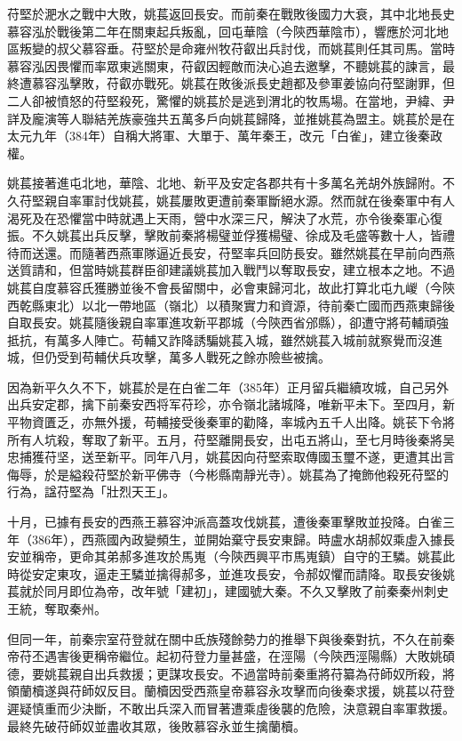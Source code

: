 苻堅於淝水之戰中大敗，姚萇返回長安。而前秦在戰敗後國力大衰，其中北地長史慕容泓於戰後第二年在關東起兵叛亂，回屯華陰（今陝西華陰市），響應於河北地區叛變的叔父慕容垂。苻堅於是命雍州牧苻叡出兵討伐，而姚萇則任其司馬。當時慕容泓因畏懼而率眾東逃關東，苻叡因輕敵而決心追去邀擊，不聽姚萇的諫言，最終遭慕容泓擊敗，苻叡亦戰死。姚萇在敗後派長史趙都及參軍姜協向苻堅謝罪，但二人卻被憤怒的苻堅殺死，驚懼的姚萇於是逃到渭北的牧馬場。在當地，尹緯、尹詳及龐演等人聯結羌族豪強共五萬多戶向姚萇歸降，並推姚萇為盟主。姚萇於是在太元九年（384年）自稱大將軍、大單于、萬年秦王，改元「白雀」，建立後秦政權。

姚萇接著進屯北地，華陰、北地、新平及安定各郡共有十多萬名羌胡外族歸附。不久苻堅親自率軍討伐姚萇，姚萇屢敗更遭前秦軍斷絕水源。然而就在後秦軍中有人渴死及在恐懼當中時就遇上天雨，營中水深三尺，解決了水荒，亦令後秦軍心復振。不久姚萇出兵反擊，擊敗前秦將楊璧並俘獲楊璧、徐成及毛盛等數十人，皆禮待而送還。而隨著西燕軍隊逼近長安，苻堅率兵回防長安。雖然姚萇在早前向西燕送質請和，但當時姚萇群臣卻建議姚萇加入戰鬥以奪取長安，建立根本之地。不過姚萇自度慕容氏獲勝並後不會長留關中，必會東歸河北，故此打算北屯九嵕（今陝西乾縣東北）以北一帶地區（嶺北）以積聚實力和資源，待前秦亡國而西燕東歸後自取長安。姚萇隨後親自率軍進攻新平郡城（今陝西省邠縣），卻遭守將苟輔頑強抵抗，有萬多人陣亡。苟輔又詐降誘騙姚萇入城，雖然姚萇入城前就察覺而沒進城，但仍受到苟輔伏兵攻擊，萬多人戰死之餘亦險些被擒。

因為新平久久不下，姚萇於是在白雀二年（385年）正月留兵繼續攻城，自己另外出兵安定郡，擒下前秦安西将军苻珍，亦令嶺北諸城降，唯新平未下。至四月，新平物資匱乏，亦無外援，苟輔接受後秦軍的勸降，率城內五千人出降。姚苌下令將所有人坑殺，奪取了新平。五月，苻堅離開長安，出屯五將山，至七月時後秦將吴忠捕獲苻坚，送至新平。同年八月，姚萇因向苻堅索取傳國玉璽不遂，更遭其出言侮辱，於是縊殺苻堅於新平佛寺（今彬縣南靜光寺）。姚萇為了掩飾他殺死苻堅的行為，諡苻堅為「壯烈天王」。

十月，已據有長安的西燕王慕容沖派高蓋攻伐姚萇，遭後秦軍擊敗並投降。白雀三年（386年），西燕國內政變頻生，並開始棄守長安東歸。時盧水胡郝奴乘虛入據長安並稱帝，更命其弟郝多進攻於馬嵬（今陝西興平市馬嵬鎮）自守的王驎。姚萇此時從安定東攻，逼走王驎並擒得郝多，並進攻長安，令郝奴懼而請降。取長安後姚萇就於同月即位為帝，改年號「建初」，建國號大秦。不久又擊敗了前秦秦州刺史王統，奪取秦州。

但同一年，前秦宗室苻登就在關中氐族殘餘勢力的推舉下與後秦對抗，不久在前秦帝苻丕遇害後更稱帝繼位。起初苻登力量甚盛，在涇陽（今陝西涇陽縣）大敗姚碩德，要姚萇親自出兵救援；更謀攻長安。不過當時前秦重將苻纂為苻師奴所殺，將領蘭櫝遂與苻師奴反目。蘭櫝因受西燕皇帝慕容永攻擊而向後秦求援，姚萇以苻登遲疑慎重而少決斷，不敢出兵深入而冒著遭乘虛後襲的危險，決意親自率軍救援。最終先破苻師奴並盡收其眾，後敗慕容永並生擒蘭櫝。


